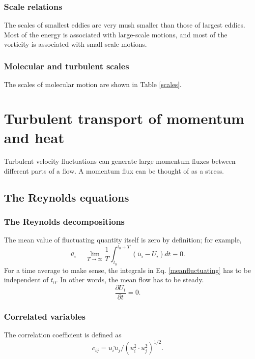 \documentclass[review]{elsarticle}
\numberwithin{equation}{section}
\begin{document}
		\subsubsection{Scale relations}
			The scales of smallest eddies are very mush smaller than those of largest eddies. Most of the energy is associated with 
			large-scale motions, and most of the vorticity is associated with small-scale motions.
		\subsubsection{Molecular and turbulent scales}
			The scales of molecular motion are shown in Table \ref{scales}.
			
\section{Turbulent transport of momentum and heat}
	Turbulent velocity fluctuations can generate large momentum fluxes between different parts of a flow. A momentum flux can 
	be thought of as a stress.
	\subsection{The Reynolds equations}	
	\subsubsection{The Reynolds decompositions}
		The mean value of fluctuating quantity itself is zero by definition; for example,
		\begin{equation}\label{meanfluctuating}
			\bar{u_i} = \lim _{T \rightarrow \infty} \frac{1}{T} \int_{t_0}^{t_0 + T} (\tilde{u_i} - U_i)dt \equiv 0.
		\end{equation}
		For a time average to make sense, the integrals in Eq. \ref{meanfluctuating} has to be independent of $t_0$. In 
		other words, the mean flow has to be steady.
		\begin{equation}
			\frac{\partial U_i}{\partial t} = 0.
		\end{equation}
		
	\subsubsection{Correlated variables}
		The correlation coefficient is defined as 
		\begin{equation} \label{cij}
			c_{ij} = \overline{u_i u_j}/\left( \overline{u_i^2} \cdotp \overline{u_j^2}\right)^{1/2}.
		\end{equation}
\end{document}
